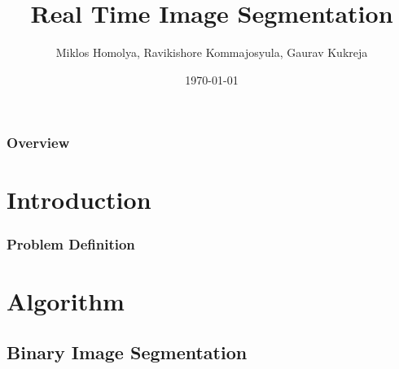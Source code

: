 \documentclass{beamer}
\title[Short title]{Real Time Image Segmentation} %
\author{Miklos Homolya, Ravikishore Kommajosyula, Gaurav Kukreja} %
\institute[TUM] %
{
Technical University of Munich \\ %
\medskip
}
\date{\today} %
\begin{document}

\begin{frame}
\titlepage %
\end{frame}

\begin{frame}
\frametitle{Overview} %
\tableofcontents %
\end{frame}


\section{Introduction} %

\begin{frame}
\frametitle{Problem Definition}

\end{frame}


\section{Algorithm}

\subsection{Binary Image Segmentation}
\end{document}
